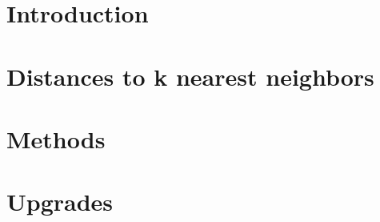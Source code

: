 \documentclass{scrreprt}[english]
\author{Amandine BURCON}
\begin{document}


\newpage
{}
\tableofcontents

\chapter{Introduction}


\chapter{Distances to k nearest neighbors}


\chapter{Methods}


\chapter{Upgrades}


%
\end{document}
